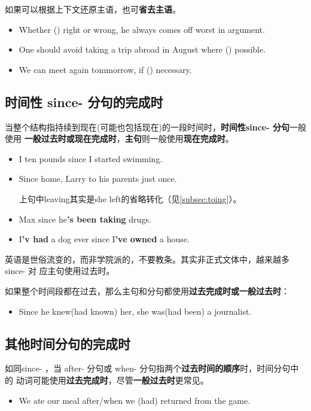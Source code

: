 如果可以根据上下文还原主语，也可\textbf{省去主语}。
\begin{itemize}
\item Whether () right or wrong, he always comes off worst in
  argument.

\item One should avoid taking a trip abroad in August where () possible.

\item We can meet again tommorrow, if () necessary.

\end{itemize}

\subsection{时间性 since- 分句的完成时}

当整个结构指持续到现在(可能也包括现在)的一段时间时，\textbf{时间性since- 分句}一般使用
\textbf{一般过去时或现在完成时}，\textbf{主句}则一般使用\textbf{现在完成时}。

\begin{itemize}
\item I  ten pounds since I started swimming.
\item Since  home, Larry  to his parents just once.

  上句中leaving其实是she left的省略转化（见\cref{subsec:toing}）。

\item Max  since he\textbf{'s been taking} drugs.
\item I\textbf{'v had} a dog ever since I\textbf{'ve owned} a house.
\end{itemize}

英语是世俗流变的，而非学院派的，不要教条。其实非正式文体中，越来越多since- 对
应主句使用过去时。

如果整个时间段都在过去，那么主句和分句都使用\textbf{过去完成时或一般过去时}：
\begin{itemize}
\item Since he knew(had known) her, she was(had been) a journalist.
\end{itemize}

\subsection{其他时间分句的完成时}

如同since- ，当 after- 分句或 when- 分句指两个\textbf{过去时间的顺序}时，时间分句中的
动词可能使用\textbf{过去完成时}，尽管\textbf{一般过去时}更常见。
\begin{itemize}
\item We ate our meal after/when we (had) returned from the game.
\end{itemize}

